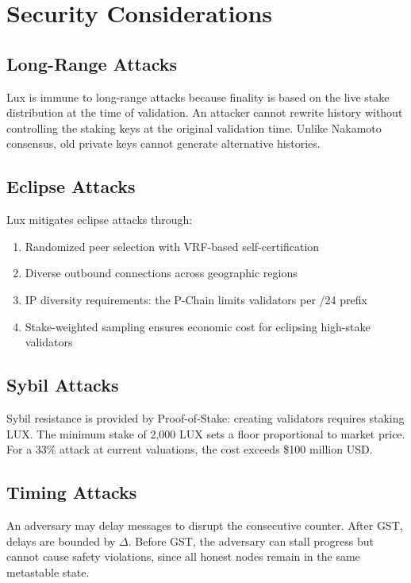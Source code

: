 \section{Security Considerations}

\label{sec:security}

\subsection{Long-Range Attacks}

Lux is immune to long-range attacks because finality is based on the live stake distribution
at the time of validation. An attacker cannot rewrite history without controlling the staking
keys at the original validation time. Unlike Nakamoto consensus, old private keys cannot
generate alternative histories.

\subsection{Eclipse Attacks}

Lux mitigates eclipse attacks through:
\begin{enumerate}[nosep]
\item Randomized peer selection with VRF-based self-certification
\item Diverse outbound connections across geographic regions
\item IP diversity requirements: the P-Chain limits validators per /24 prefix
\item Stake-weighted sampling ensures economic cost for eclipsing high-stake validators
\end{enumerate}

\subsection{Sybil Attacks}

Sybil resistance is provided by Proof-of-Stake: creating validators requires staking LUX.
The minimum stake of 2,000 LUX sets a floor proportional to market price. For a 33\%
attack at current valuations, the cost exceeds \$100 million USD.

\subsection{Timing Attacks}

An adversary may delay messages to disrupt the consecutive counter. After GST, delays are
bounded by $\Delta$. Before GST, the adversary can stall progress but cannot cause safety
violations, since all honest nodes remain in the same metastable state.

